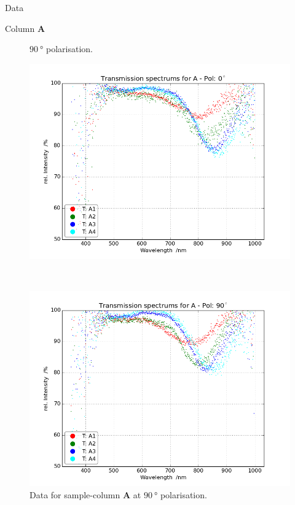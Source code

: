 \begin{appendix}
\begin{chapter}{Data}
\begin{section}{Column \textbf{A}}
\begin{figure}[ht!]
\begin{minipage}{.92\textwidth}
{              $\SI{90}{\degree}$ polarisation.}
          \label{fig:Refspec_APol90}
        \end{minipage}
      \end{figure}
      \newpage
      \begin{figure}[ht!]
        \centering
        \begin{minipage}{.92\textwidth}
          \centering
          \includegraphics[width=\textwidth]{Figures/TransspecRAW_APol0.png}
          \caption{Data for sample-column \textbf{A} at $\SI{0}{\degree}$
              polarisation.}
          \label{fig:TransspecRAW_APol0}
        \end{minipage}\\
        \begin{minipage}{.92\textwidth}
          \centering
          \includegraphics[width=\textwidth]{Figures/TransspecRAW_APol90.png}
          \caption{Data for sample-column \textbf{A} at $\SI{90}{\degree}$
              polarisation.}
          \label{fig:TransspecRAW_APol90}
        \end{minipage}
      \end{figure}
      

\end{section}
\end{chapter}
\end{appendix}
